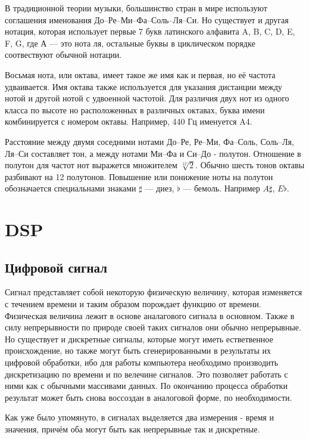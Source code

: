 \documentclass[oneside, final, 12pt]{extarticle}
\begin{document}
  В традиционной теории музыки, большинство стран в мире используют
  соглашения именования До--Ре--Ми--Фа--Соль--Ля--Си. Но существует
  и другая нотация, которая использует первые 7 букв латинского
  алфавита A, B, C, D, E, F, G, где А --- это нота ля, остальные
  буквы в циклическом порядке соотвествуют обычной нотации.

  Восьмая нота, или октава, имеет такое же имя как и первая, но её частота
  удваивается. Имя октава также используется для указания дистанции между
  нотой и другой нотой с удвоенной частотой. Для различия двух нот из одного
  класса по высоте но расположенных в различных октавах, буква имени
  комбинируется с номером октавы. Например, 440 Гц именуется A4.

  Расстояние между двумя соседними нотами До--Ре, Ре--Ми, Фа--Соль, Соль--Ля,
  Ля--Си составляет тон, а между нотами Ми--Фа и Си--До - полутон. Отношение
  в полутон для частот нот выражется множителем $\sqrt[12]{2}$. Обычно
  шесть тонов октавы разбивают на 12 полутонов. Повышение или понижение
  ноты на полутон обозначается специальнами знаками $\sharp$ --- диез,
  $\flat$ --- бемоль. Например $A\sharp$, $E\flat$.

\cleardoublepage

\section{DSP}

\subsection{Цифровой сигнал}
  Сигнал представляет собой некоторую физическую величину, которая
  изменяется с течением времени и таким образом порождает функцию
  от времени. Физическая величина лежит в основе аналагового сигнала
  в основном. Также в силу непрерывности по природе своей таких сигналов
  они обычно непрерывные. Но существует и дискретные сигналы, которые
  могут иметь естветвенное происхождение, но также могут быть
  сгенерированными в результаты их цифровой обработки, ибо
  для работы компьютера необходимо производить дискретизацию по времени
  и по велечине сигналов. Это позволяет работать с ними как с обычными
  массивами данных. По окончанию процесса обработки результат может
  быть снова воссоздан в аналоговой форме, по необходимости.

  Как уже было упомянуто, в сигналах выделяется два измерения - время и
  значения, причём оба могут быть как непрерывные так и дискретные.
\end{document}
